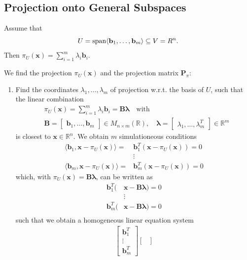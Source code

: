 \documentclass[12pt,openany]{book}
\theoremstyle{definition}
\newcommand{\R}{\mathbb{R}}
\newcommand{\by}{\times}
\newcommand{\Span}[1]{\textnormal{span}\langle #1\rangle}
\newcommand{\inner}[1]{\langle #1\rangle}
\renewcommand{\vec}[1]{\textbf{#1}}
\begin{document}
	\subsection{Projection onto General Subspaces}
	
	Assume that \[
	U=\Span{\vec{b}_1,\dots,\vec{b}_m}\subseteq V=R^n.
	\] Then \(\pi_U(\vec{x})=\sum_{i=1}^m\lambda_i\vec{b}_i\).
	
	We find the projection \(\pi_U(\vec{x})\) and the projection matrix \(\textbf{P}_\pi\):
	
	\begin{enumerate}[(Step 1)]
		\item Find the coordinates \(\lambda_1,\dots,\lambda_m\) of projection w.r.t. the basis of \(U\), such that the linear combination \begin{align*}
			&\pi_U(\vec{x})=\sum_{i=1}^m\lambda_i\vec{b}_i=\textbf{B}\boldsymbol{\lambda}\quad\text{with}\\
			&\textbf{B}=\begin{bmatrix}
				\vec{b}_1,\dots,\vec{b}_m
			\end{bmatrix}\in M_{n\by m}(\R),\quad\boldsymbol{\lambda}=\begin{bmatrix}
			\lambda_1,\dots,\lambda_m^T
		\end{bmatrix}\in\R^m
		\end{align*} is closest to \(\vec{x}\in\R^n\).
		We obtain \(m\) simulationeous conditions \begin{align*}
			\inner{\vec{b}_1,\vec{x}-\pi_U(\vec{x})}=&\vec{b}_1^T(\vec{x}-\pi_U(\vec{x}))=0\\
			&\vdots\\
			\inner{\vec{b}_m,\vec{x}-\pi_U(\vec{x})}=&\vec{b}_m^T(\vec{x}-\pi_U(\vec{x}))=0
		\end{align*} which, with \(\pi_U(\vec{x})=\textbf{B}\boldsymbol{\lambda}\), can be written as \begin{align*}
		\vec{b}_1^T(&\vec{x}-\textbf{B}\boldsymbol{\lambda})=0\\
		&\vdots\\
		\vec{b}_m^T(&\vec{x}-\textbf{B}\boldsymbol{\lambda})=0\\
	\end{align*} such that we obtain a homogeneous linear equation system \begin{align*}
		\begin{bmatrix}
			\vec{b}_1^T\\ \vdots\\ \vec{b}_m^T
		\end{bmatrix}\begin{bmatrix}

\end{bmatrix}
\end{align*}
\end{enumerate}
\end{document}
